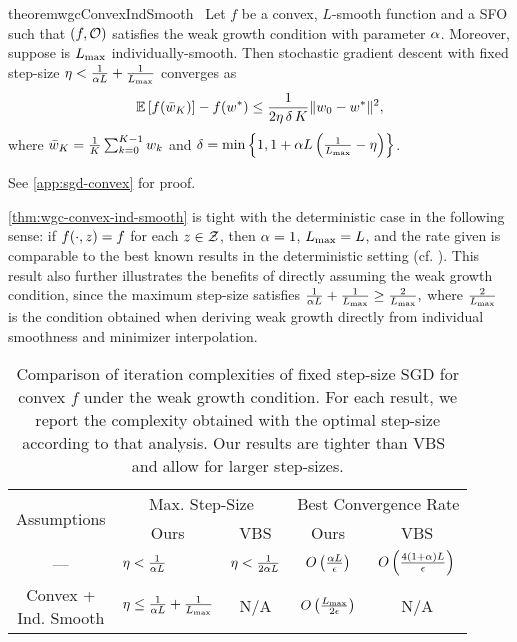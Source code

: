 \begin{restatable}{theorem}{wgcConvexIndSmooth}~\label{thm:wgc-convex-ind-smooth}
    Let \( f \) be a convex, \( L \)-smooth function and \oracle{} a \ac{SFO} such that \( \rbr{f, \oracle{}} \) satisfies the weak growth condition with parameter \( \wgc \).
    Moreover, suppose \oracle{} is \( \Lmax \) individually-smooth. 
    Then stochastic gradient descent with fixed step-size \( \eta < \frac{1}{\wgc L} + \frac{1}{\Lmax} \) converges as
    \[ \E\sbr{f(\bar w_K)} - f(\wopt) \leq \frac{1}{2\eta \, \delta \, K} \norm{\w_0 - \wopt}^2,   \]
    where \( \bar \w_K = \frac{1}{K} \sum_{k=0}^{K-1} \wk \) and \( \delta = \min \cbr{ 1, 1 + \wgc L \rbr{\frac{1}{\Lmax} - \eta }} \). 
\end{restatable}
\noindent See \autoref{app:sgd-convex} for proof. \hfill \break

\autoref{thm:wgc-convex-ind-smooth} is tight with the deterministic case in the following sense: if \( f(\cdot, \z) = f \) for each \( z \in \calZ \), then \( \wgc = 1 \), \( \Lmax = L \), and the rate given is comparable to the best known results in the deterministic setting (cf. \citet[Theorem 3.3]{bubeck2015convex}). 
This result also further illustrates the benefits of directly assuming the weak growth condition, since the maximum step-size satisfies 
\( \frac{1}{\wgc L} + \frac{1}{\Lmax} \geq \frac{2}{\Lmax}, \)
where \( \frac{2}{\Lmax} \) is the condition obtained when deriving weak growth directly from individual smoothness and minimizer interpolation.
\begin{table}[t]
    \centering
    \begin{tabular}{c l l c c  }\toprule
        \multirow{2}{*}{Assumptions} & \multicolumn{2}{c}{Max. Step-Size}  & \multicolumn{2}{c}{Best Convergence Rate}\\%
        \cmidrule(lr){2-3} \cmidrule(l){4-5}
                 & \multicolumn{1}{c}{Ours} & \multicolumn{1}{c}{VBS} & \multicolumn{1}{c}{Ours} & \multicolumn{1}{c}{VBS}\\ \midrule
    —            & \( \eta < \frac{1}{\wgc L} \)%
                 & \( \eta < \frac{1}{2 \wgc L} \)%
                 & \( O\rbr{\frac{\wgc L }{\epsilon}} \)%
                 & \( O\rbr{\frac{4 \rbr{1 + \wgc} L}{\epsilon} } \)\\ \addlinespace 
    \makecell{Convex + \\ Ind. Smooth}%
                 & \( \eta \leq \frac{1}{\wgc L} + \frac{1}{\Lmax} \)%
                 & \multicolumn{1}{c}{N/A}%
                 & \( O\rbr{\frac{\Lmax}{2 \epsilon}} \)%
                 & \multicolumn{1}{c}{N/A} \\ \bottomrule 
    \end{tabular}
    \caption{Comparison of iteration complexities of fixed step-size \ac{SGD} for convex \( f \) under the weak growth condition. For each result, we report the complexity obtained with the optimal step-size according to that analysis. Our results are tighter than VBS~\citep{vaswani2019fast} and allow for larger step-sizes.}%
    \label{table:sgd-comparison}
\end{table}


